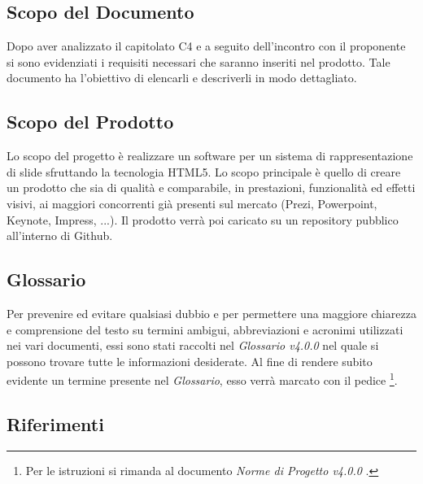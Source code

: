 \subsection{Scopo del Documento}
Dopo aver analizzato il capitolato C4 e a seguito dell'incontro con il proponente si sono evidenziati i requisiti
necessari che saranno inseriti nel prodotto. Tale documento ha l'obiettivo di elencarli e descriverli in modo dettagliato.

\subsection{Scopo del Prodotto}
Lo scopo del progetto è realizzare un software per un sistema di rappresentazione di \gls{slide} sfruttando la tecnologia \gls{HTML5}.
Lo scopo principale è quello di creare un prodotto che sia di qualità e comparabile, in prestazioni, funzionalità ed 
effetti visivi, ai maggiori concorrenti già presenti sul mercato (Prezi, Powerpoint, Keynote, Impress, ...).
Il prodotto verrà poi caricato su un \gls{repository} pubblico all'interno di \gls{Github}.

\subsection{Glossario}
Per prevenire ed evitare qualsiasi dubbio e per permettere una maggiore chiarezza e comprensione del testo su termini ambigui, abbreviazioni e acronimi utilizzati nei vari documenti, essi sono stati raccolti nel \textit{Glossario v4.0.0} nel quale si possono trovare tutte le informazioni desiderate.
Al fine di rendere subito evidente un termine presente nel \textit{Glossario}, esso verrà marcato con il pedice \G\footnote{Per le istruzioni si rimanda al documento \textit{Norme di Progetto v4.0.0} .}.

\subsection{Riferimenti}
